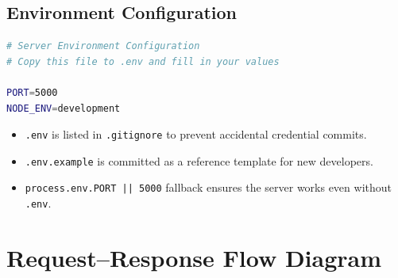 \documentclass[11pt,a4paper]{article}
\begin{document}
\subsection{Environment Configuration}

\begin{lstlisting}[language=bash, caption={.env.example --- Environment Template}]
# Server Environment Configuration
# Copy this file to .env and fill in your values

PORT=5000
NODE_ENV=development
\end{lstlisting}

\begin{itemize}
    \item \texttt{.env} is listed in \texttt{.gitignore} to prevent accidental credential commits.
    \item \texttt{.env.example} is committed as a reference template for new developers.
    \item \texttt{process.env.PORT || 5000} fallback ensures the server works even without \texttt{.env}.
\end{itemize}

\newpage

\section{Request--Response Flow Diagram}
\end{document}

